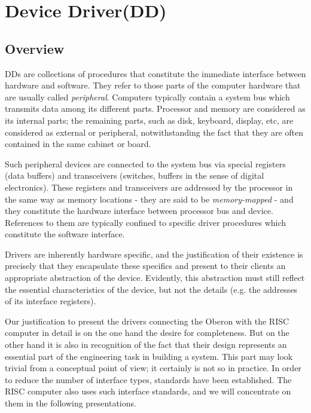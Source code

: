 \chapter{Device Driver(DD)}
\label{ch:DD}
\section{Overview}
DDs are collections of procedures that constitute the immediate interface between hardware
and software. They refer to those parts of the computer hardware that are usually called
\emph{peripheral}. Computers typically contain a system bus which transmits data among its
different parts. Processor and memory are considered as its internal parts; the remaining
parts, such as disk, keyboard, display, etc, are considered as external or peripheral,
notwithstanding the fact that they are often contained in the same cabinet or board.

Such peripheral devices are connected to the system bus via special registers (data buffers)
and transceivers (switches, buffers in the sense of digital electronics). These registers
and transceivers are addressed by the processor in the same way as memory locations - they
are said to be \emph{memory-mapped} - and they constitute the hardware interface between
processor bus and device. References to them are typically confined to specific driver
procedures which constitute the software interface.

Drivers are inherently hardware specific, and the justification of their existence is precisely
that they encapsulate these specifics and present to their clients an appropriate abstraction
of the device. Evidently, this abstraction must still reflect the essential characteristics
of the device, but not the details (e.g. the addresses of its interface registers).

Our justification to present the drivers connecting the Oberon with the RISC computer in
detail is on the one hand the desire for completeness. But on the other hand it is also in
recognition of the fact that their design represents an essential part of the engineering
task in building a system. This part may look trivial from a conceptual point of view; it
certainly is not so in practice. In order to reduce the number of interface types, standards
have been established. The RISC computer also uses such interface standards, and we will
concentrate on them in the following presentations.

